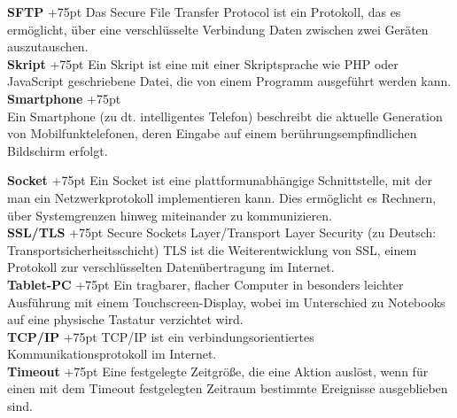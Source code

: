 \documentclass[fontsize = 12pt, paper = a4]{scrreprt}
\begin{document}
\begin{spacing}{0.95}
\textbf{SFTP}
\hangindent+75pt 
\hspace*{11.25mm}
Das Secure File Transfer Protocol ist ein Protokoll, das es ermöglicht, über eine verschlüsselte Verbindung Daten zwischen zwei Geräten auszutauschen.\\

\textbf{Skript}
\hangindent+75pt 
\hspace*{10mm}
Ein Skript ist eine mit einer Skriptsprache wie PHP oder JavaScript geschriebene Datei, die von einem Programm ausgeführt werden kann.\\

\textbf{Smartphone}
\hangindent+75pt  \\
Ein Smartphone (zu dt. intelligentes Telefon) beschreibt die aktuelle Gene\-ration von Mobilfunktelefonen, deren Eingabe auf einem berührungsempfindlichen Bildschirm erfolgt.\\

\end{spacing}

\textbf{Socket}
\hangindent+75pt 
\hspace*{10mm}
Ein Socket ist eine plattformunabhängige Schnittstelle, mit der man ein Netzwerkprotokoll implementieren kann. Dies ermöglicht es Rechnern, über Systemgrenzen hinweg miteinander zu kommunizieren.\\

\textbf{SSL/TLS}
\hangindent+75pt 
\hspace*{4.5mm}
Secure Sockets Layer/Transport Layer Security (zu Deutsch: Transportsicherheitsschicht) TLS ist die Weiterentwicklung von SSL, einem Protokoll zur verschlüsselten Datenübertragung im Internet.\\

\textbf{Tablet-PC}
\hangindent+75pt  
\hspace*{3mm}
Ein tragbarer, flacher Computer in besonders leichter Ausführung mit einem Touchscreen-Display, wobei im Unterschied zu Notebooks auf eine physische Tastatur verzichtet wird.\\

\textbf{TCP/IP}
\hangindent+75pt 
\hspace*{6mm}
TCP/IP ist ein verbindungsorientiertes Kommunikationsprotokoll im Internet.\\

\textbf{Timeout}
\hangindent+75pt 
\hspace*{6mm}
Eine festgelegte Zeitgröße, die eine Aktion auslöst, wenn für einen mit dem Timeout festgelegten Zeitraum bestimmte Ereignisse ausgeblieben sind.\\
\end{document}
